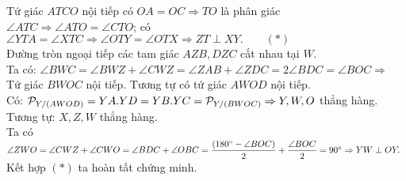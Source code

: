 \documentclass[12pt,a4paper]{article}
\begin{document}
Tứ giác $ATCO$ nội tiếp có $OA=OC\Rightarrow TO$ là phân giác $\angle ATC\Rightarrow\angle ATO=\angle CTO$; có $\angle YTA=\angle XTC\Rightarrow\angle OTY=\angle OTX\Rightarrow ZT\perp XY. \qquad(*)$\\

Đường tròn ngoại tiếp các tam giác $AZB, DZC$ cắt nhau tại $W$.\\

Ta có: $\angle BWC=\angle BWZ+\angle CWZ=\angle ZAB+\angle ZDC=2\angle BDC=\angle BOC\Rightarrow$ Tứ giác $BWOC$ nội tiếp. Tương tự có tứ giác $AWOD$ nội tiếp.\\

Có: $\mathcal{P}_{Y/(AWOD)}=YA.YD=YB.YC=\mathcal{P}_{Y/(BWOC)}\Rightarrow\space Y,W,O$ thẳng hàng. Tương tự: $X,Z,W$ thẳng hàng.\\

Ta có $\angle ZWO=\angle CWZ+\angle CWO=\angle BDC+\angle OBC=\dfrac{(180^{\circ}-\angle BOC)}{2}+\dfrac{\angle BOC}{2}=90^{\circ}\newline\Rightarrow YW\perp OY.\enspace$ Kết hợp $(*)$ ta hoàn tất chứng minh.
\end{document}
